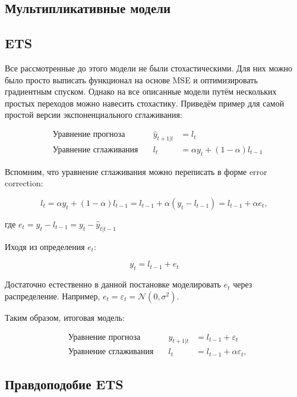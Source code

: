 \documentclass[12pt,fleqn]{article}
\begin{document}
\subsection{Мультипликативные модели}

\subsection{ETS}

Все рассмотренные до этого модели не были стохастическими. Для них можно было просто выписать функционал на основе MSE и оптимизировать градиентным спуском. Однако на все описанные модели путём нескольких простых переходов можно навесить стохастику. Приведём пример для самой простой версии экспоненциального сглаживания:

\begin{equation}
	\begin{array}{llll}
		&\text{Уравнение прогноза} \quad & 	\hat{y}_{t+1|t}& = l_t \\
		&\text{Уравнение сглаживания}\quad & l_t& =\alpha y_t +(1-\alpha) l_{t-1}
	\end{array}
\end{equation}

Вспомним, что уравнение сглаживания можно переписать в форме error correction:

\begin{equation}
   l_t = \alpha y_t +(1-\alpha) l_{t-1} =  l_{t-1}  + \alpha (y_t - l_{t-1}) =  l_{t-1}  + \alpha e_t,
\end{equation}

где $e_t = y_t - l_{t-1} = y_t - \hat{y}_{t|t-1}$

Иходя из определения $e_t$:

\begin{equation}
y_t = l_{t-1} + e_t
\end{equation}

Достаточно естественно в данной постановке моделировать $e_t$ через распределение. Например, $e_t = \varepsilon_t = \mathcal{N}(0, \sigma^2)$.

Таким образом, итоговая модель:

\begin{equation}
	\begin{array}{llll}
		&\text{Уравнение прогноза} \quad & 	\hat{y}_{t+1|t}& = l_{t-1} + \varepsilon_t \\
		&\text{Уравнение сглаживания}\quad & l_t & = l_{t-1}  + \alpha \varepsilon_t,
	\end{array}
\end{equation}


\subsection{Правдоподобие ETS}
\end{document}
